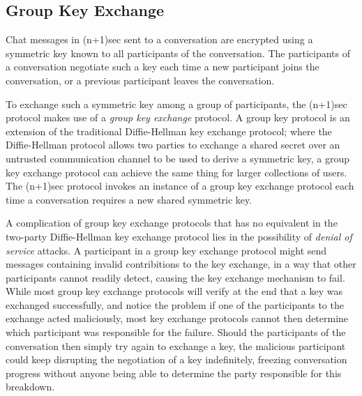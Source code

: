 \documentclass{article}
\begin{document}




\subsection{Group Key Exchange}
\label{sec:cryptography/group-key-exchange}

Chat messages in (n+1)sec sent to a conversation are encrypted using a symmetric key known to all participants of the conversation.
The participants of a conversation negotiate such a key each time a new participant joins the conversation, or a previous participant leaves the conversation.

To exchange such a symmetric key among a group of participants, the (n+1)sec protocol makes use of a \emph{group key exchange} protocol.
A group key protocol is an extension of the traditional Diffie-Hellman key exchange protocol; where the Diffie-Hellman protocol allows two parties to exchange a shared secret over an untrusted communication channel to be used to derive a symmetric key, a group key exchange protocol can achieve the same thing for larger collections of users.
The (n+1)sec protocol invokes an instance of a group key exchange protocol each time a conversation requires a new shared symmetric key.

A complication of group key exchange protocols that has no equivalent in the two-party Diffie-Hellman key exchange protocol lies in the possibility of \emph{denial of service} attacks.
A participant in a group key exchange protocol might send messages containing invalid contribitions to the key exchange, in a way that other participants cannot readily detect, causing the key exchange mechanism to fail.
While most group key exchange protocols will verify at the end that a key was exchanged successfully, and notice the problem if one of the participants to the exchange acted maliciously, most key exchange protocols cannot then determine which participant was responsible for the failure.
Should the participants of the conversation then simply try again to exchange a key, the malicious participant could keep disrupting the negotiation of a key indefinitely, freezing conversation progress without anyone being able to determine the party responsible for this breakdown.
\end{document}
